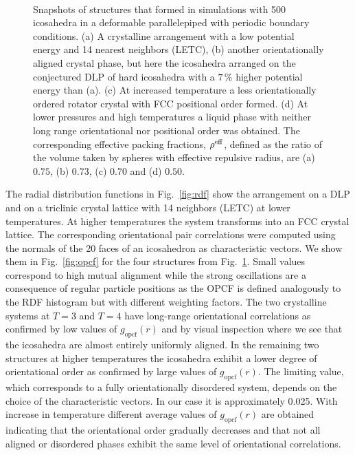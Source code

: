 \documentclass[10pt,aps,pre,twocolumn,superscriptaddress,amsmath,amssymb]{revtex4-1}
\begin{document}
\begin{figure}
  \centering
  \\
  \caption{
  Snapshots of structures that formed in simulations with 500 icosahedra in a deformable parallelepiped with periodic boundary conditions.
  (a) A crystalline arrangement with a low potential energy and 14 nearest neighbors (LETC),
  (b) another orientationally aligned crystal phase, but here the icosahedra arranged on the conjectured DLP of hard icosahedra with a $7\,\%$ higher potential energy than (a).
  (c) At increased temperature a less orientationally ordered rotator crystal with FCC positional order formed.
  (d) At lower pressures and high temperatures a liquid phase with neither long range orientational nor positional order was obtained.
  The corresponding effective packing fractions, $\rho^{\rm eff}$, defined as the ratio of the volume taken by spheres with effective repulsive radius, are (a) $0.75$, (b) $0.73$, (c) $0.70$ and (d) $0.50$.
  }
  \label{fig:snaps}
\end{figure}

The radial distribution functions in Fig.~\ref{fig:rdf} show the arrangement on a DLP and on a triclinic crystal lattice with 14 neighbors (LETC) at lower temperatures. At higher temperatures the system transforms into an FCC crystal lattice.
The corresponding orientational pair correlations were computed using the normals of the 20 faces of an icosahedron as characteristic vectors. We show them in Fig.~\ref{fig:opcf} for the four structures from Fig.~\ref{fig:snaps}.
Small values correspond to high mutual alignment while the strong oscillations are a consequence of regular particle positions as the OPCF is defined analogously to the RDF histogram but with different weighting factors.
The two crystalline systems at $T=3$ and $T=4$ have long-range orientational correlations as confirmed by low values of $g_\text{opcf}(r)$ and by visual inspection where we see that the icosahedra are almost entirely uniformly aligned.
In the remaining two structures at higher temperatures the icosahedra exhibit a lower degree of orientational order as confirmed by large values of $g_\text{opcf}(r)$.
The limiting value, which corresponds to a fully orientationally disordered system, depends on the choice of the characteristic vectors. In our case it is approximately 0.025.
With increase in temperature different average values of $g_\text{opcf}(r)$ are obtained indicating that the orientational order gradually decreases and that not all aligned or disordered phases exhibit the same level of orientational correlations.
\end{document}

